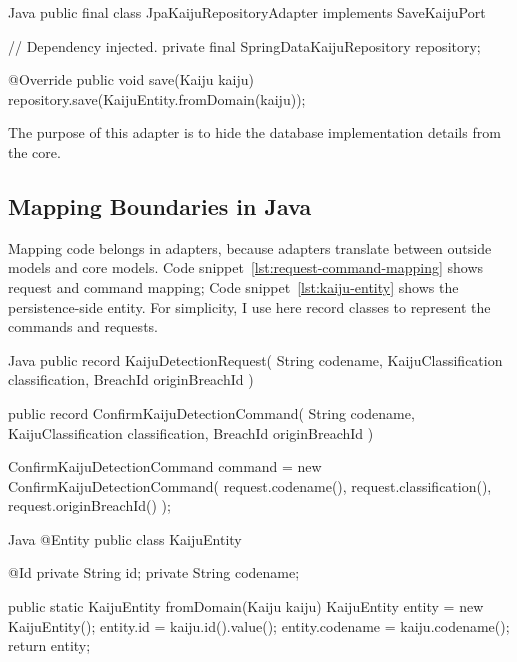 \begin{ridercode}{Java}
public final class JpaKaijuRepositoryAdapter
    implements SaveKaijuPort
{
    // Dependency injected.
    private final SpringDataKaijuRepository repository;

    @Override
    public void save(Kaiju kaiju)
    {
        repository.save(KaijuEntity.fromDomain(kaiju));
    }
}
\end{ridercode}
\label{lst:jpa-kaiju-adapter}

The purpose of this adapter is to hide the database implementation details from the core.

\subsection{Mapping Boundaries in Java}
\label{sec:hexagonal_java_mapping_boundaries}

Mapping code belongs in adapters, because adapters translate between outside models and core models. Code snippet~\ref{lst:request-command-mapping} shows request and command mapping; Code snippet~\ref{lst:kaiju-entity} shows the persistence-side entity. For simplicity, I use here record classes to represent the commands and requests.

\begin{ridercode}{Java}
public record KaijuDetectionRequest(
    String codename,
    KaijuClassification classification,
    BreachId originBreachId
) {}

public record ConfirmKaijuDetectionCommand(
    String codename,
    KaijuClassification classification,
    BreachId originBreachId
) {}

ConfirmKaijuDetectionCommand command =
    new ConfirmKaijuDetectionCommand(
        request.codename(),
        request.classification(),
        request.originBreachId()
    );
\end{ridercode}
\label{lst:request-command-mapping}

\begin{ridercode}{Java}
@Entity
public class KaijuEntity
{
    @Id
    private String id;
    private String codename;

    public static KaijuEntity fromDomain(Kaiju kaiju)
    {
        KaijuEntity entity = new KaijuEntity();
        entity.id = kaiju.id().value();
        entity.codename = kaiju.codename();
        return entity;
    }
}
\end{ridercode}
\label{lst:kaiju-entity}

